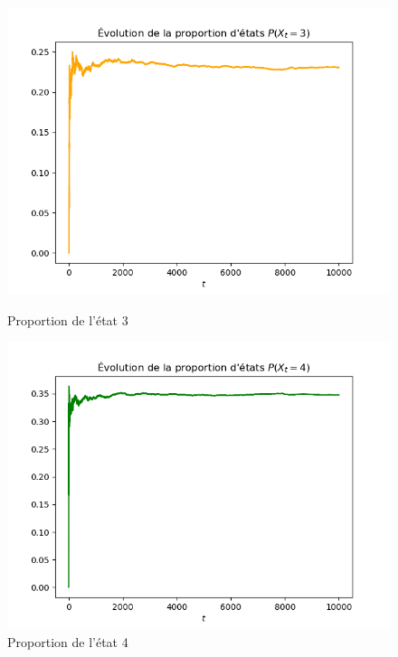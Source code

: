 \begin{figure}[!h]
  \centering
  \begin{minipage}{.5\textwidth}
    \centering
    \includegraphics[width=\linewidth]{figs/evo3.png}
    \caption{Proportion de l'état 3}
  \end{minipage}%
  \begin{minipage}{.5\textwidth}
    \centering
    \includegraphics[width=\linewidth]{figs/evo4.png}
    \caption{Proportion de l'état 4}
  \end{minipage}
\end{figure}

